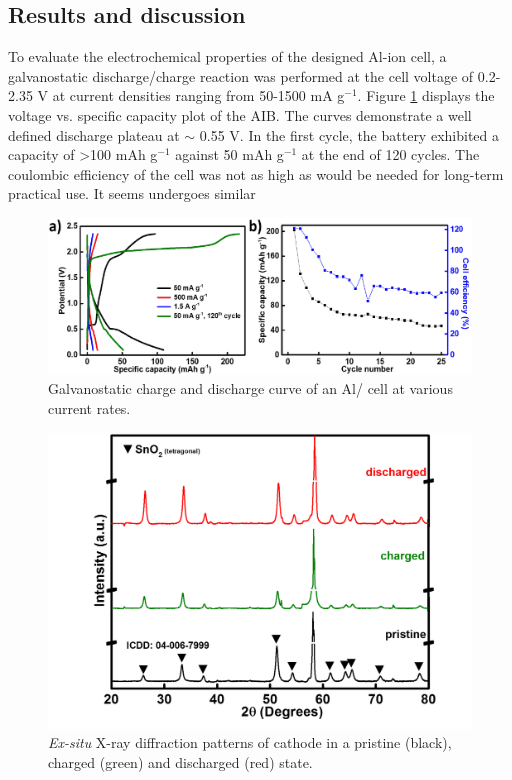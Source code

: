 \subsection{Results and discussion}
To evaluate the electrochemical properties of the designed Al-ion cell, a galvanostatic discharge/charge reaction was performed at the cell voltage of 0.2-2.35 V at current densities ranging from 50-1500 mA g$^{-1}$. Figure \ref{Figures/chap6fig:SnO2perCDC} displays the voltage vs. specific capacity plot of the AIB. The curves demonstrate a well defined discharge plateau at $\sim$ 0.55 V. In the first cycle, the
battery exhibited a capacity of >100 mAh g$^{-1}$ against 50 mAh g$^{-1}$ at the end of 120 cycles. The coulombic efficiency of the cell was not as high as would be needed for long-term practical use. It seems  undergoes similar  

 \begin{figure}[th!]
  \centering
  \includegraphics[width=\textwidth]{Figures/chap6fig/SnO2perfCDC}
    \caption{Galvanostatic charge and discharge curve of an Al/ cell at various current rates.}
  \label{Figures/chap6fig:SnO2perCDC}
\end{figure}

 \begin{figure}[th!]
  \centering
  \includegraphics[width=\textwidth]{Figures/chap6fig/SnO2XRD}
    \caption{\textit{Ex-situ} X-ray diffraction patterns of  cathode in a pristine (black), charged (green) and discharged (red) state.}
  \label{Figures/chap6fig:SnO2XRD}
\end{figure}


